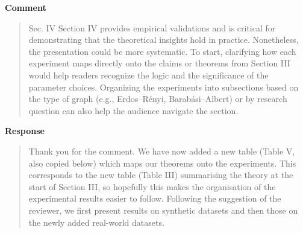 \documentclass[11pt,onecolumn,journal]{IEEEtran}
\theoremstyle{definition}
\begin{document}
\textbf{Comment}
\begin{quote}
Sec. IV
Section IV provides empirical validations and is critical for demonstrating that the theoretical insights hold in practice. Nonetheless, the presentation could be more systematic. To start, clarifying how each experiment maps directly onto the claims or theorems from Section III would help readers recognize the logic and the significance of the parameter choices. Organizing the experiments into subsections based on the type of graph (e.g., Erdos–Rényi, Barabási–Albert) or by research question can also help the audience navigate the section.
\end{quote}

\textbf{Response}
\begin{quote}
Thank you for the comment. We have now added a new table (Table V, also copied below) which maps our theorems onto the experiments. This corresponds to the new table (Table III) summarising the theory at the start of Section III, so hopefully this makes the organisation of the experimental results easier to follow. Following the suggestion of the reviewer, we first present results on synthetic datasets and then those on the newly added real-world datasets.



\end{quote}
\end{document}
